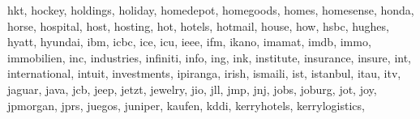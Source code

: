 \documentclass[letterpaper,10pt,english]{sphinxmanual}
\begin{document}
\begin{fulllineitems}
\begin{fulllineitems}
\textquotesingle{}hkt\textquotesingle{}, \textquotesingle{}hockey\textquotesingle{}, \textquotesingle{}holdings\textquotesingle{}, \textquotesingle{}holiday\textquotesingle{}, \textquotesingle{}homedepot\textquotesingle{}, \textquotesingle{}homegoods\textquotesingle{}, \textquotesingle{}homes\textquotesingle{}, \textquotesingle{}homesense\textquotesingle{}, \textquotesingle{}honda\textquotesingle{}, \textquotesingle{}horse\textquotesingle{}, \textquotesingle{}hospital\textquotesingle{}, \textquotesingle{}host\textquotesingle{}, \textquotesingle{}hosting\textquotesingle{}, \textquotesingle{}hot\textquotesingle{}, \textquotesingle{}hotels\textquotesingle{}, \textquotesingle{}hotmail\textquotesingle{}, \textquotesingle{}house\textquotesingle{}, \textquotesingle{}how\textquotesingle{}, \textquotesingle{}hsbc\textquotesingle{}, \textquotesingle{}hughes\textquotesingle{}, \textquotesingle{}hyatt\textquotesingle{}, \textquotesingle{}hyundai\textquotesingle{}, \textquotesingle{}ibm\textquotesingle{}, \textquotesingle{}icbc\textquotesingle{}, \textquotesingle{}ice\textquotesingle{}, \textquotesingle{}icu\textquotesingle{}, \textquotesingle{}ieee\textquotesingle{}, \textquotesingle{}ifm\textquotesingle{}, \textquotesingle{}ikano\textquotesingle{}, \textquotesingle{}imamat\textquotesingle{}, \textquotesingle{}imdb\textquotesingle{}, \textquotesingle{}immo\textquotesingle{}, \textquotesingle{}immobilien\textquotesingle{}, \textquotesingle{}inc\textquotesingle{}, \textquotesingle{}industries\textquotesingle{}, \textquotesingle{}infiniti\textquotesingle{}, \textquotesingle{}info\textquotesingle{}, \textquotesingle{}ing\textquotesingle{}, \textquotesingle{}ink\textquotesingle{}, \textquotesingle{}institute\textquotesingle{}, \textquotesingle{}insurance\textquotesingle{}, \textquotesingle{}insure\textquotesingle{}, \textquotesingle{}int\textquotesingle{}, \textquotesingle{}international\textquotesingle{}, \textquotesingle{}intuit\textquotesingle{}, \textquotesingle{}investments\textquotesingle{}, \textquotesingle{}ipiranga\textquotesingle{}, \textquotesingle{}irish\textquotesingle{}, \textquotesingle{}ismaili\textquotesingle{}, \textquotesingle{}ist\textquotesingle{}, \textquotesingle{}istanbul\textquotesingle{}, \textquotesingle{}itau\textquotesingle{}, \textquotesingle{}itv\textquotesingle{}, \textquotesingle{}jaguar\textquotesingle{}, \textquotesingle{}java\textquotesingle{}, \textquotesingle{}jcb\textquotesingle{}, \textquotesingle{}jeep\textquotesingle{}, \textquotesingle{}jetzt\textquotesingle{}, \textquotesingle{}jewelry\textquotesingle{}, \textquotesingle{}jio\textquotesingle{}, \textquotesingle{}jll\textquotesingle{}, \textquotesingle{}jmp\textquotesingle{}, \textquotesingle{}jnj\textquotesingle{}, \textquotesingle{}jobs\textquotesingle{}, \textquotesingle{}joburg\textquotesingle{}, \textquotesingle{}jot\textquotesingle{}, \textquotesingle{}joy\textquotesingle{}, \textquotesingle{}jpmorgan\textquotesingle{}, \textquotesingle{}jprs\textquotesingle{}, \textquotesingle{}juegos\textquotesingle{}, \textquotesingle{}juniper\textquotesingle{}, \textquotesingle{}kaufen\textquotesingle{}, \textquotesingle{}kddi\textquotesingle{}, \textquotesingle{}kerryhotels\textquotesingle{}, \textquotesingle{}kerrylogistics\textquotesingle{}, 
\end{fulllineitems}
\end{fulllineitems}
\end{document}
